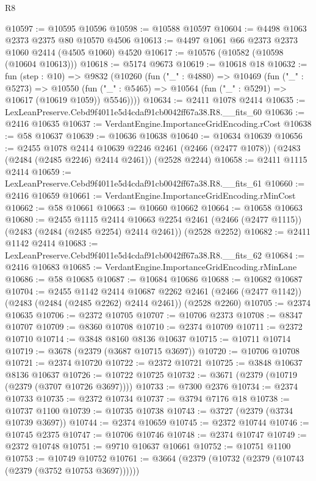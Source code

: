 \begin{lexlean}{R8}
\begin{coremodule}
@10597 := @10595 @10596
@10598 := @10588 @10597
@10604 := @4498 @1063 @2373 @2375 @80 @10570 @4506
@10613 := @4497 @1061 @66 @2373 @2373 @1060 @2414 (@4505 @1060) @4520
@10617 := @10576 (@10582 (@10598 (@10604 @10613)))
@10618 := @5174 @9673
@10619 := @10618 @18
@10632 := fun (step : @10) =>
  @9832
    (@10260
      (fun ("_" : @4880) =>
      @10469
        (fun ("_" : @5273) =>
        @10550 (fun ("_" : @5465) => @10564 (fun ("_" : @5291) => @10617 (@10619 @1059)) @5546))))
@10634 := @2411 @1078 @2414
@10635 := LexLeanPreserve.Cebd9f4011e5d4cdaf91cb0042ff67a38.R8.__fits_60
@10636 := @2416 @10635
@10637 := VerdantEngine.ImportanceGridEncoding.rCost
@10638 := @58 @10637
@10639 := @10636 @10638
@10640 := @10634 @10639
@10656 := @2455
    @1078
    @2414
    @10639
    @2246
    @2461
    (@2466 (@2477 @1078))
    (@2483 (@2484 (@2485 @2246) @2414 @2461))
    (@2528 @2244)
@10658 := @2411 @1115 @2414
@10659 := LexLeanPreserve.Cebd9f4011e5d4cdaf91cb0042ff67a38.R8.__fits_61
@10660 := @2416 @10659
@10661 := VerdantEngine.ImportanceGridEncoding.rMinCost
@10662 := @58 @10661
@10663 := @10660 @10662
@10664 := @10658 @10663
@10680 := @2455
    @1115
    @2414
    @10663
    @2254
    @2461
    (@2466 (@2477 @1115))
    (@2483 (@2484 (@2485 @2254) @2414 @2461))
    (@2528 @2252)
@10682 := @2411 @1142 @2414
@10683 := LexLeanPreserve.Cebd9f4011e5d4cdaf91cb0042ff67a38.R8.__fits_62
@10684 := @2416 @10683
@10685 := VerdantEngine.ImportanceGridEncoding.rMinLane
@10686 := @58 @10685
@10687 := @10684 @10686
@10688 := @10682 @10687
@10704 := @2455
    @1142
    @2414
    @10687
    @2262
    @2461
    (@2466 (@2477 @1142))
    (@2483 (@2484 (@2485 @2262) @2414 @2461))
    (@2528 @2260)
@10705 := @2374 @10635
@10706 := @2372 @10705
@10707 := @10706 @2373
@10708 := @8347 @10707
@10709 := @8360 @10708
@10710 := @2374 @10709
@10711 := @2372 @10710
@10714 := @3848 @8160 @8136 @10637
@10715 := @10711 @10714
@10719 := @3678 (@2379 (@3687 @10715 @3697))
@10720 := @10706 @10708
@10721 := @2374 @10720
@10722 := @2372 @10721
@10725 := @3848 @10637 @8136 @10637
@10726 := @10722 @10725
@10732 := @3671 (@2379 (@10719 (@2379 (@3707 @10726 @3697))))
@10733 := @7300 @2376
@10734 := @2374 @10733
@10735 := @2372 @10734
@10737 := @3794 @7176 @18
@10738 := @10737 @1100
@10739 := @10735 @10738
@10743 := @3727 (@2379 (@3734 @10739 @3697))
@10744 := @2374 @10659
@10745 := @2372 @10744
@10746 := @10745 @2375
@10747 := @10706 @10746
@10748 := @2374 @10747
@10749 := @2372 @10748
@10751 := @9710 @10637 @10661
@10752 := @10751 @1100
@10753 := @10749 @10752
@10761 := @3664 (@2379 (@10732 (@2379 (@10743 (@2379 (@3752 @10753 @3697))))))

\end{coremodule}
\end{lexlean}
